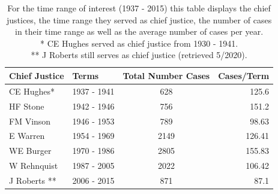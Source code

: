 \documentclass[headsepline=true, abstracton]{scrartcl}
\begin{document}
\begin{table}[bt]
	\label{tab:chiefs}
	\centering
	\begin{tabular}{l l c r}
		 {Chief Justice} & {Terms} & {Total Number Cases} & {Cases/Term} \\ \hline
		CE Hughes*              & 1937 - 1941                                          & 628                                                               & 125.6                                                     \\ 
		HF Stone                & 1942 - 1946                                          & 756                                                               & 151.2                                                     \\ 
		FM Vinson               & 1946 - 1953                                          & 789                                                               & 98.63                                                      \\ 
		E Warren                & 1954 - 1969                                          & 2149                                                              & 126.41                                                     \\ 
		WE Burger               & 1970 - 1986                                          & 2805                                                             & 155.83                                                     \\ 
		W Rehnquist            & 1987 - 2005                                          & 2022                                                              & 106.42                                                      \\ 
		J Roberts **           & 2006 - 2015                                          & 871                                                              & 87.1                                           \\ 
	\end{tabular}
		\caption{For the time range of interest (1937 - 2015) this table displays the chief justices, the time range they served as chief justice, the number of cases in their time range as well as the average number of cases per year.\\\hspace{\textwidth} * CE Hughes served as chief justice from 1930 - 1941. \\\hspace{\textwidth} ** J Roberts still serves as chief justice (retrieved 5/2020).}
\end{table}
\end{document}

